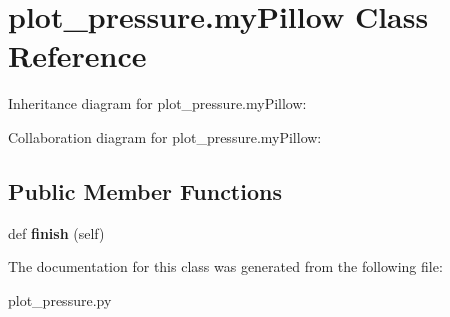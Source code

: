 \hypertarget{classplot__pressure_1_1myPillow}{}\section{plot\+\_\+pressure.\+my\+Pillow Class Reference}
\label{classplot__pressure_1_1myPillow}


Inheritance diagram for plot\+\_\+pressure.\+my\+Pillow\+:


Collaboration diagram for plot\+\_\+pressure.\+my\+Pillow\+:
\subsection*{Public Member Functions}
\begin{DoxyCompactItemize}
\item 
\mbox{\label{classplot__pressure_1_1myPillow_ad31eb2acf73f340c443ca8ee550bfc5a}} 
def {\bfseries finish} (self)
\end{DoxyCompactItemize}


The documentation for this class was generated from the following file\+:\begin{DoxyCompactItemize}
\item 
plot\+\_\+pressure.\+py\end{DoxyCompactItemize}
